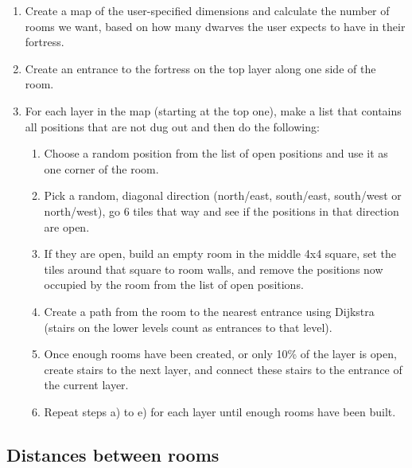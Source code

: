 \begin{enumerate}

	\item Create a map of the user-specified dimensions and calculate the number of rooms we want, based on how many dwarves the user expects to have in their fortress.

	\item Create an entrance to the fortress on the top layer along one side of the room.

	\item For each layer in the map (starting at the top one), make a list that contains all positions that are not dug out and then do the following:

	\begin{enumerate}
		
		\item Choose a random position from the list of open positions and use it as one corner of the room.

		\item Pick a random, diagonal direction (north/east, south/east, south/west or north/west), go 6 tiles that way and see if the positions in that direction are open.

		\item If they are open, build an empty room in the middle 4x4 square, set the tiles around that square to room walls, and remove the positions now occupied by the room from the list of open positions.

		\item Create a path from the room to the nearest entrance using Dijkstra (stairs on the lower levels count as entrances to that level).

		\item Once enough rooms have been created, or only 10\% of the layer is open, create stairs to the next layer, and connect these stairs to the entrance of the current layer.

		\item Repeat steps a) to e) for each layer until enough rooms have been built.

	\end{enumerate}

\end{enumerate}
\subsection{Distances between rooms}
\label{04_Distances}

